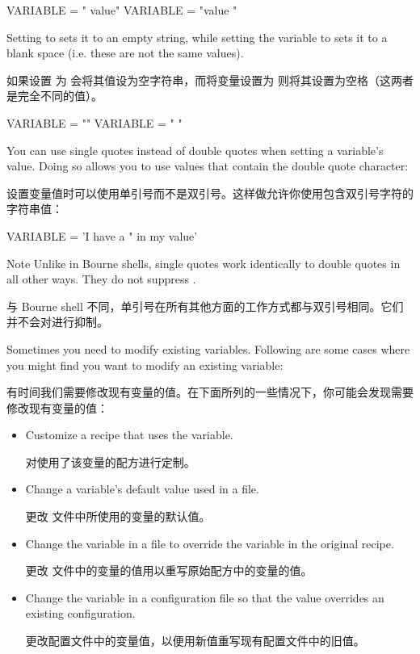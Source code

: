 \begin{pyglist}
VARIABLE = " value"
VARIABLE = "value "
\end{pyglist}

Setting  to  sets it to an empty string, while setting the variable to   sets it to a blank space (i.e. these are not the same values).

如果设置  为  会将其值设为空字符串，而将变量设置为 则将其设置为空格（这两者是完全不同的值）。

\begin{pyglist}
VARIABLE = ""
VARIABLE = " "
\end{pyglist}

You can use single quotes instead of double quotes when setting a variable's value. Doing so allows you to use values that contain the double quote character:

设置变量值时可以使用单引号而不是双引号。这样做允许你使用包含双引号字符的字符串值：

\begin{pyglist}
VARIABLE = 'I have a " in my value'
\end{pyglist}

\begin{noteblock}{Note}%
Unlike in Bourne shells, single quotes work identically to double quotes in all other ways. They do not suppress .

\medskip
与 Bourne shell 不同，单引号在所有其他方面的工作方式都与双引号相同。它们并不会对进行抑制。
\end{noteblock}


Sometimes you need to modify existing variables. Following are some cases where you might find you want to modify an existing variable:

有时间我们需要修改现有变量的值。在下面所列的一些情况下，你可能会发现需要修改现有变量的值：

\begin{itemize}
\setlength\itemsep{1.0em}
\item Customize a recipe that uses the variable.

\medskip
对使用了该变量的配方进行定制。

\item Change a variable's default value used in a  file.

\medskip
更改  文件中所使用的变量的默认值。

\item Change the variable in a  file to override the variable in the original recipe.

\medskip
更改  文件中的变量的值用以重写原始配方中的变量的值。

\item Change the variable in a configuration file so that the value overrides an existing configuration.

\medskip
更改配置文件中的变量值，以便用新值重写现有配置文件中的旧值。
\end{itemize}

